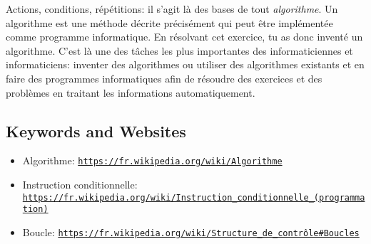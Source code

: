 \documentclass[a4paper,11pt]{report}
\newcommand{\BrochureUrlText}[1]{\texttt{#1}}
\begin{document}
Actions, conditions, répétitions: il s’agit là des bases de tout \emph{algorithme}. Un algorithme est une méthode décrite précisément qui peut être implémentée comme programme informatique. En résolvant cet exercice, tu as donc inventé un algorithme. C’est là une des tâches les plus importantes des informaticiennes et informaticiens: inventer des algorithmes ou utiliser des algorithmes existants et en faire des programmes informatiques afin de résoudre des exercices et des problèmes en traitant les informations automatiquement.

{\raggedright

\subsection*{Keywords and Websites}

\begin{itemize}
  \item Algorithme: \href{https://fr.wikipedia.org/wiki/Algorithme}{\BrochureUrlText{https://fr.wikipedia.org/wiki/Algorithme}}
  \item Instruction conditionnelle: \href{https://fr.wikipedia.org/wiki/Instruction_conditionnelle_(programmation)}{\BrochureUrlText{https://fr.wikipedia.org/wiki/Instruction\_conditionnelle\_(programmation)}}
  \item Boucle: \href{https://fr.wikipedia.org/wiki/Structure_de_contr\%C3\%B4le\#Boucles}{\BrochureUrlText{https://fr.wikipedia.org/wiki/Structure\_de\_contrôle\#Boucles}}
\end{itemize}


}
\end{document}
